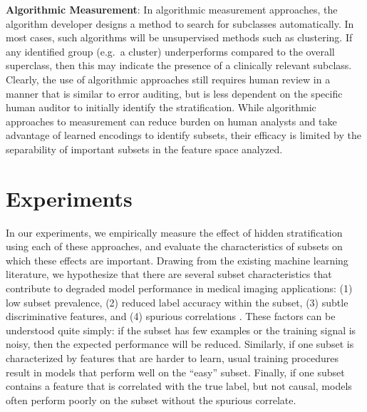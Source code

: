 \documentclass[sigconf]{acmart}
\begin{document}
\textbf{Algorithmic Measurement}: In algorithmic measurement approaches, the algorithm developer designs a method to search for subclasses automatically. 
In most cases, such algorithms will be unsupervised methods such as clustering. 
If any identified group (e.g.~a cluster) underperforms compared to the overall superclass, then this may indicate the presence of a clinically relevant subclass.
Clearly, the use of algorithmic approaches still requires human review in a manner that is similar to error auditing, but is less dependent on the specific human auditor to initially identify the stratification.  
While algorithmic approaches to measurement can reduce burden on human analysts and take advantage of learned encodings to identify subsets, their efficacy is limited by the separability of important subsets in the feature space analyzed.

\section{Experiments}
\label{sec:exps}

In our experiments, we empirically measure the effect of hidden stratification using each of these approaches, and evaluate the characteristics of subsets on which these effects are important.  
Drawing from the existing machine learning literature, we hypothesize that there are several subset characteristics that contribute to degraded model performance in medical imaging applications: (1) low subset prevalence, (2) reduced label accuracy within the subset, (3) subtle discriminative features, and (4) spurious correlations \citep{Selbst2017-gz}. 
These factors can be understood quite simply: if the subset has few examples or the training signal is noisy, then the expected performance will be reduced.  
Similarly, if one subset is characterized by features that are harder to learn, usual training procedures result in models that perform well on the ``easy'' subset.
Finally, if one subset contains a feature that is correlated with the true label, but not causal, models often perform poorly on the subset without the spurious correlate.
\end{document}
